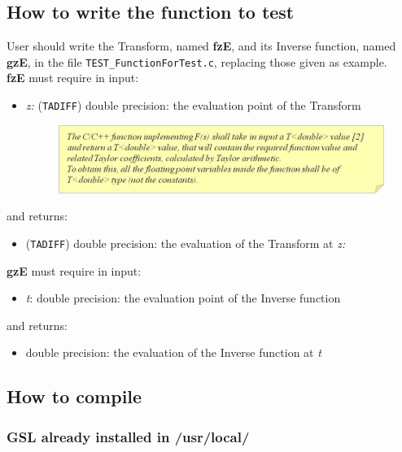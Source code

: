 \documentclass[10pt]{article}
\begin{document}
\subsection{How to write the function to test}

User should write the Transform, named \textbf{fzE}, and its Inverse function, named \textbf{gzE}, in the file {\tt TEST\_FunctionForTest.c}, replacing those given as example.\\
\textbf{fzE} must require in input:
 \begin{itemize}
 \item \emph{z:} ({\tt TADIFF}) double precision: the evaluation point of the Transform

 \begin{figure}[!h]
\begin{flushright}

\includegraphics[scale=0.8]{Immagine11}

\end{flushright}
\end{figure}

 \end{itemize}
and returns:
 \begin{itemize}
 \item ({\tt TADIFF}) double precision: the evaluation of the Transform at \emph{z:}
 \end{itemize}

\textbf{gzE} must require in input:
 \begin{itemize}
 \item \emph{t}: double precision: the evaluation point of the Inverse function
 \end{itemize}
and returns:
 \begin{itemize}
 \item double precision: the evaluation of the Inverse function at \emph{t}
 \end{itemize}

\subsection{How to compile}

\subsubsection{GSL already installed in /usr/local/}
\end{document}
